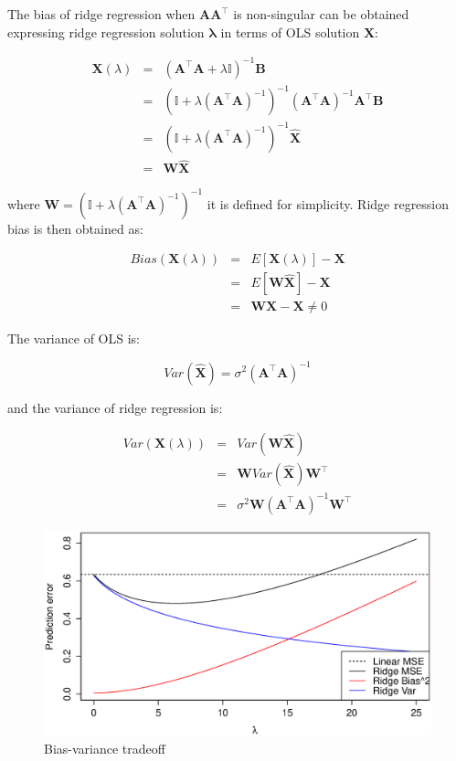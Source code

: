 The bias of ridge regression when $\mathbf{A A^\top}$ is non-singular
can be obtained expressing ridge regression solution
$\mathbf{\lambda}$ in terms of OLS solution $\hat{\mathbf{X}}$:

\begin{eqnarray*}
\mathbf{X}(\lambda) &=&( \mathbf{A}^\top \mathbf{A} + \lambda \mathbb{I})^{-1}\mathbf{B} \\
&=& (\mathbb{I} + \lambda (\mathbf{A}^\top \mathbf{A})^{-1})^{-1} (\mathbf{A}^\top \mathbf{A})^{-1}\mathbf{A}^\top \mathbf{B} \\
&=&  (\mathbb{I} + \lambda (\mathbf{A}^\top \mathbf{A})^{-1})^{-1}  \hat{\mathbf{X}} \\
&=& \mathbf{W} \hat{\mathbf{X}} 
\end{eqnarray*}

\noindent where $\mathbf{W}  = (\mathbb{I} + \lambda (\mathbf{A}^\top
\mathbf{A})^{-1})^{-1}  $ it is defined for simplicity. Ridge
regression bias is then obtained as:

\begin{eqnarray*}
Bias(\mathbf{X}(\lambda)) &=& E[\mathbf{X}(\lambda)] - \mathbf{X} \\
&=& E[\mathbf{W}\hat{\mathbf{X}}] - \mathbf{X} \\
&=&  \mathbf{W} \mathbf{X} - \mathbf{X} \neq 0 
\end{eqnarray*}



The variance of OLS is:

\begin{equation*}
Var(\hat{\mathbf{X}}) = \sigma^2 (\mathbf{A}^\top \mathbf{A} )^{-1}
\end{equation*}

\noindent and the variance of ridge regression is:

\begin{eqnarray*}
Var(\mathbf{X}(\lambda)) &=& Var(\mathbf{W}\hat{\mathbf{X}}) \\ 
&=& \mathbf{W}Var(\hat{\mathbf{X}})\mathbf{W}^\top \\
&=& \sigma^2 \mathbf{W}(\mathbf{A}^\top \mathbf{A} )^{-1}\mathbf{W}^\top
\end{eqnarray*}


\begin{figure}[h!]
\includegraphics[width=0.8\linewidth]{img/biasvariance}
\caption{Bias-variance tradeoff}
\label{fig:biasvariance}
\end{figure}

